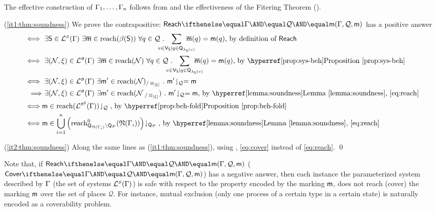 \begin{proofE}
  The effective construction of $\Gamma_1,\ldots,\Gamma_n$ follows
  from  and the
  effectiveness of the Fitering Theorem ().

  \vspace*{\baselineskip}
  \noindent(\ref{it1:thm:soundness}) We prove the contrapositive: $\paramreach{\grammar}{\mathcal{Q}}{\amark}$ has a positive answer
  \begin{align*}
    \iff & ~\exists \asys \in \alangof{}{\algof{S}}{\grammar} ~\exists \overline{\amark} \in \reach{\behof{\asys}} ~\forall q \in \mathcal{Q} ~.~
    \hspace*{-5mm} \sum_{v \in \vertof{\asys} \mid q \in \placeof{\vlabof{\asys}(v)}} \hspace*{-5mm} \overline{\amark}(q) = \amark(q)
    \text{, by definition of $\mathsf{Reach}$} \\
    \iff & ~\exists (\amarkednet,\sources) \in \alangof{}{\algof{B}}{\grammar} ~\exists \overline{\amark} \in \reach{\amarkednet} ~\forall q \in \mathcal{Q} ~.~
    \hspace*{-5mm} \sum_{v \in \vertof{\asys} \mid q \in \placeof{\vlabof{\asys}(v)}} \hspace*{-5mm} \overline{\amark}(q) = \amark(q)
    \text{, by \propref{prop:sys-beh}} \\
    \iff & ~\exists (\amarkednet,\sources) \in \alangof{}{\algof{B}}{\grammar} ~\exists \amark' \in \reach{\amarkednet}_{/\foldrel{\sources}} ~.~ \proj{\amark'}{\mathcal{Q}} = \amark \\
    \Longrightarrow & ~\exists (\amarkednet,\sources) \in \alangof{}{\algof{B}}{\grammar} ~\exists \amark' \in \reach{\amarkednet_{~/\foldrel{\sources}}} ~.~ \proj{\amark'}{\mathcal{Q}} = \amark
    \text{, by \lemref{lemma:soundness}, \autoref{eq:reach}} \\
    \iff & \amark \in \proj{\reach{\alangof{}{\absof{\algof{B}}}{\grammar}}}{\mathcal{Q}} \text{, by \propref{prop:beh-fold}} \\
    \iff & \amark \in \bigcup_{i=1}^n \proj{\left(\zreach{\placeof{\foldpn{\grammar_i}} \setminus \placeof{\ptypes}}{\foldpn{\grammar_i}}\right)}{\placeof{\ptypes}}
    \text{, by \lemref{lemma:soundness}, \autoref{eq:reach}}
  \end{align*}
  
  \vspace*{\baselineskip}
  \noindent(\ref{it2:thm:soundness}) Along the same lines as
  (\ref{it1:thm:soundness}), using ,
  \autoref{eq:cover} instead of \autoref{eq:reach}. \qed
\end{proofE}
\noindent Note that, if $\paramreach{\grammar}{\mathcal{Q}}{\amark}$
(\resp $\paramcover{\grammar}{\mathcal{Q}}{\amark}$) has a negative
answer, then each instance the parameterized system described by
$\Gamma$ (\ie the set of systems $\mathcal{L}_{}^{\scriptscriptstyle{\mathcal{S}}}({\Gamma})$)
is safe with respect to the property encoded by the marking $\mathsf{m}$,
\ie does not reach (\resp cover) the marking $\mathsf{m}$ over the set of
places $\mathcal{Q}$. For instance, mutual exclusion (only one process
of a certain type in a certain state) is naturally encoded as a
coverability problem.
